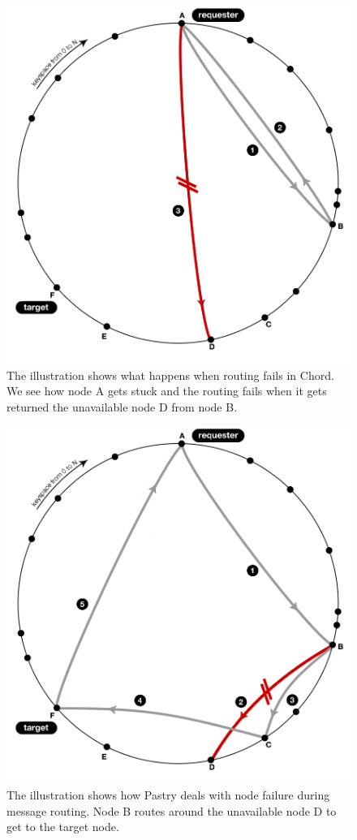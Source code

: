 \begin{figure}[!htb]
\begin{center}
  \includegraphics[width=0.9\linewidth]{illustrations/ChordRoutingFailed.png}
  \caption{The illustration shows what happens when routing fails in Chord. We see how node A gets stuck and the routing fails when it gets returned the unavailable node D from node B.}
  \label{figureChordFailedLookup}
\end{center}
\end{figure}

\begin{figure}[!htb]
\begin{center}
  \includegraphics[width=0.9\linewidth]{illustrations/PastryRoutingFailed.png}
  \caption{The illustration shows how Pastry deals with node failure during message routing. Node B routes around the unavailable node D to get to the target node.}
  \label{figurePastryFailedLookup}
\end{center}
\end{figure}


